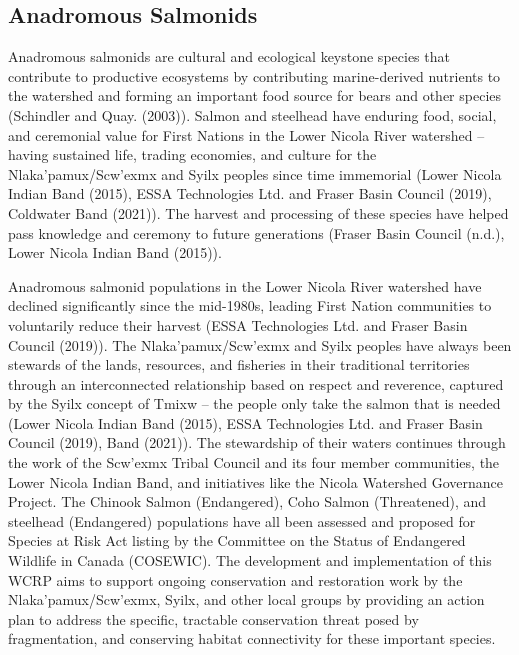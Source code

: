 \documentclass[
  letterpaper,
  DIV=11,
  numbers=noendperiod]{scrreprt}
\begin{document}
\hypertarget{anadromous-salmonids}{%
\subsection*{Anadromous Salmonids}\label{anadromous-salmonids}}

Anadromous salmonids are cultural and ecological keystone species that
contribute to productive ecosystems by contributing marine-derived
nutrients to the watershed and forming an important food source for
bears and other species (Schindler and Quay. (2003)). Salmon and
steelhead have enduring food, social, and ceremonial value for First
Nations in the Lower Nicola River watershed -- having sustained life,
trading economies, and culture for the Nlaka'pamux/Scw'exmx and Syilx
peoples since time immemorial (Lower Nicola Indian Band (2015), ESSA
Technologies Ltd. and Fraser Basin Council (2019), Coldwater Band
(2021)). The harvest and processing of these species have helped pass
knowledge and ceremony to future generations (Fraser Basin Council
(n.d.), Lower Nicola Indian Band (2015)).

Anadromous salmonid populations in the Lower Nicola River watershed have
declined significantly since the mid-1980s, leading First Nation
communities to voluntarily reduce their harvest (ESSA Technologies Ltd.
and Fraser Basin Council (2019)). The Nlaka'pamux/Scw'exmx and Syilx
peoples have always been stewards of the lands, resources, and fisheries
in their traditional territories through an interconnected relationship
based on respect and reverence, captured by the Syilx concept of Tmixw
-- the people only take the salmon that is needed (Lower Nicola Indian
Band (2015), ESSA Technologies Ltd. and Fraser Basin Council (2019),
Band (2021)). The stewardship of their waters continues through the work
of the Scw'exmx Tribal Council and its four member communities, the
Lower Nicola Indian Band, and initiatives like the Nicola Watershed
Governance Project. The Chinook Salmon (Endangered), Coho Salmon
(Threatened), and steelhead (Endangered) populations have all been
assessed and proposed for Species at Risk Act listing by the Committee
on the Status of Endangered Wildlife in Canada (COSEWIC). The
development and implementation of this WCRP aims to support ongoing
conservation and restoration work by the Nlaka'pamux/Scw'exmx, Syilx,
and other local groups by providing an action plan to address the
specific, tractable conservation threat posed by fragmentation, and
conserving habitat connectivity for these important species.
\end{document}
